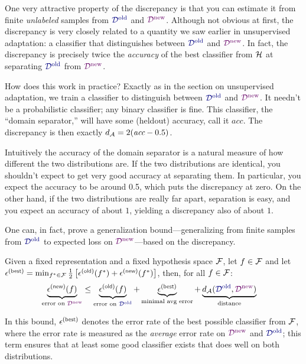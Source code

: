 One very attractive property of the discrepancy is that you can estimate it from finite \emph{unlabeled} samples from $\Dold$ and $\Dnew$.
Although not obvious at first, the discrepancy is very closely related to a quantity we saw earlier in unsupervised adaptation: a classifier that distinguishes between $\Dold$ and $\Dnew$.
In fact, the discrepancy is precisely twice the \emph{accuracy} of the best classifier from $\mathcal{H}$ at separating $\Dold$ from $\Dnew$.

How does this work in practice?
Exactly as in the section on unsupervised adaptation, we train a classifier to distinguish between $\Dold$ and $\Dnew$.
It needn't be a probabilistic classifier; any binary classifier is fine.
This classifier, the ``domain separator,'' will have some (heldout) accuracy, call it $\textit{acc}$.
The discrepancy is then exactly $d_{\mathcal{A}} = 2 (\textit{acc} - 0.5)$.

Intuitively the accuracy of the domain separator is a natural measure of how different the two distributions are.
If the two distributions are identical, you shouldn't expect to get very good accuracy at separating them.
In particular, you expect the accuracy to be around 0.5, which puts the discrepancy at zero.
On the other hand, if the two distributions are really far apart, separation is easy, and you expect an accuracy of about $1$, yielding a discrepancy also of about $1$.

One can, in fact, prove a generalization bound---generalizing from finite samples from $\Dold$ to expected loss on $\Dnew$---based on the discrepancy.
%
\begin{theorem} \label{thm:bias:adapt}
  Given a fixed representation and a fixed hypothesis space $\mathcal{F}$, let $f \in \mathcal{F}$ and let $\ep\xth{best} = \min_{f^* \in \cF} \frac 1 2 \left[ \ep\xth{old}(f^*) + \ep\xth{new}(f^*) \right]$, then, for all $f \in \mathcal{F}$:
%
\begin{align}
  \underbrace{\ep\xth{new}(f)}_{\textrm{error on } \Dnew}
  &\leq 
    \underbrace{\ep\xth{old}(f)}_{\textrm{error on } \Dold} +
    \underbrace{\ep\xth{best}}_{\textrm{minimal avg error}} +
    \underbrace{d_\cA(\Dold,\Dnew)}_{\textrm{distance}}
\end{align}
\end{theorem}
%
In this bound, $\ep\xth{best}$ denotes the error rate of the best possible classifier from $\mathcal{F}$, where the error rate is measured as the \emph{average} error rate on $\Dnew$ and $\Dold$; this term ensures that at least some good classifier exists that does well on both distributions.

